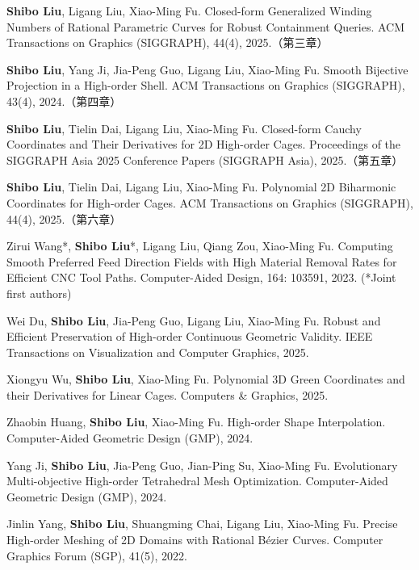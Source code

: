 
\begin{achievements}

  \begin{theachievements}[已发表论文]
    \item \textbf{Shibo Liu}, Ligang Liu, Xiao-Ming Fu. Closed-form Generalized Winding Numbers of Rational Parametric Curves for Robust Containment Queries. ACM Transactions on Graphics (SIGGRAPH), 44(4), 2025.（第三章）
    \item \textbf{Shibo Liu}, Yang Ji, Jia-Peng Guo, Ligang Liu, Xiao-Ming Fu. Smooth Bijective Projection in a High-order Shell. ACM Transactions on Graphics (SIGGRAPH), 43(4), 2024.（第四章）
    \item \textbf{Shibo Liu}, Tielin Dai, Ligang Liu, Xiao-Ming Fu. Closed-form Cauchy Coordinates and Their Derivatives for 2D High-order Cages. Proceedings of the SIGGRAPH Asia 2025 Conference Papers (SIGGRAPH Asia), 2025.（第五章）
    \item \textbf{Shibo Liu}, Tielin Dai, Ligang Liu, Xiao-Ming Fu. Polynomial 2D Biharmonic Coordinates for High-order Cages. ACM Transactions on Graphics (SIGGRAPH), 44(4), 2025.（第六章）
    \item Zirui Wang*, \textbf{Shibo Liu}*, Ligang Liu, Qiang Zou, Xiao-Ming Fu. Computing Smooth Preferred Feed Direction Fields with High Material Removal Rates for Efficient CNC Tool Paths. Computer-Aided Design, 164: 103591, 2023. (*Joint first authors)
    \item Wei Du, \textbf{Shibo Liu}, Jia-Peng Guo, Ligang Liu, Xiao-Ming Fu. Robust and Efficient Preservation of High-order Continuous Geometric Validity. IEEE Transactions on Visualization and Computer Graphics, 2025.
    \item Xiongyu Wu, \textbf{Shibo Liu}, Xiao-Ming Fu. Polynomial 3D Green Coordinates and their Derivatives for Linear Cages. Computers \& Graphics, 2025.
    \item Zhaobin Huang, \textbf{Shibo Liu}, Xiao-Ming Fu. High-order Shape Interpolation. Computer-Aided Geometric Design (GMP), 2024.
    \item Yang Ji, \textbf{Shibo Liu}, Jia-Peng Guo, Jian-Ping Su, Xiao-Ming Fu. Evolutionary Multi-objective High-order Tetrahedral Mesh Optimization. Computer-Aided Geometric Design (GMP), 2024.
    \item Jinlin Yang, \textbf{Shibo Liu}, Shuangming Chai, Ligang Liu, Xiao-Ming Fu. Precise High-order Meshing of 2D Domains with Rational B\'{e}zier Curves. Computer Graphics Forum (SGP), 41(5), 2022.
  \end{theachievements}


\end{achievements}
